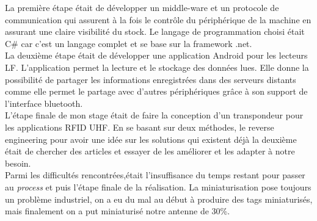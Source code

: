 \documentclass[11pt, a4paper, twoside]{book}
\begin{document}
La première étape était de développer un middle-ware et un protocole de communication qui assurent à la fois le contrôle du périphérique de la machine en assurant une claire visibilité du stock. Le langage de programmation choisi était C\# car c'est un langage complet et se base sur la framework .net.\\

La deuxième étape était de développer une application Android pour les lecteurs LF. L'application permet la lecture et le stockage des données lues. Elle donne la possibilité de partager les informations enregistrées dans des serveurs distants comme elle permet le partage avec d'autres périphériques grâce à son support de l'interface bluetooth.\\

L'étape finale  de mon stage était de faire la conception d'un transpondeur pour les applications RFID UHF. En se basant sur deux méthodes, le reverse engineering pour avoir une idée sur les solutions qui existent déjà  la deuxième était de chercher des articles et essayer de les améliorer et les adapter à notre besoin.\\

Parmi les difficultés rencontrées,était l'insuffisance du temps restant pour passer  au \emph{process} et puis l'étape finale de la réalisation. La miniaturisation pose toujours un problème industriel, on a eu du mal au début à produire des tags miniaturisés, mais finalement on  a put miniaturisé notre antenne de 30\%.\\
\end{document}
